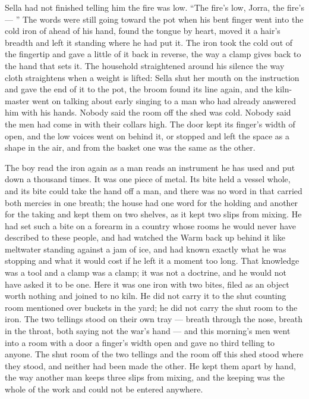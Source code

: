 Sella had not finished telling him the fire was low. “The fire's low, Jorra, the fire's --- ” The words were still going toward the pot when his bent finger went into the cold iron of  ahead of his hand, found the tongue by heart, moved it a hair's breadth and left it standing where he had put it. The iron took the cold out of the fingertip and gave a little of it back in reverse, the way a clamp gives back to the hand that sets it. The household straightened around his silence the way cloth straightens when a weight is lifted: Sella shut her mouth on the instruction and gave the end of it to the pot, the broom found its line again, and the kiln-master went on talking about early singing to a man who had already answered him with his hands. Nobody said the room off the shed was cold. Nobody said the men had come in with their collars high. The door kept its finger's width of open, and the low voices went on behind it, or stopped and left the space as a shape in the air, and from the basket one was the same as the other.

The boy read the iron again as a man reads an instrument he has used and put down a thousand times. It was one piece of metal. Its bite held a vessel whole, and its bite could take the hand off a man, and there was no word in  that carried both mercies in one breath; the house had one word for the holding and another for the taking and kept them on two shelves, as it kept two slips from mixing. He had set such a bite on a forearm in a country whose rooms he would never have described to these people, and had watched the Warm back up behind it like meltwater standing against a jam of ice, and had known exactly what he was stopping and what it would cost if he left it a moment too long. That knowledge was a tool and a clamp was a clamp; it was not a doctrine, and he would not have asked it to be one. Here it was one iron with two bites, filed as an object worth nothing and joined to no kiln. He did not carry it to the shut counting room mentioned over buckets in the yard; he did not carry the shut room to the iron. The two tellings stood on their own tray --- breath through the nose, breath in the throat, both saying not the war's hand --- and this morning's men went into a room with a door a finger's width open and gave no third telling to anyone. The shut room of the two tellings and the room off this shed stood where they stood, and neither had been made the other. He kept them apart by hand, the way another man keeps three slips from mixing, and the keeping was the whole of the work and could not be entered anywhere.

